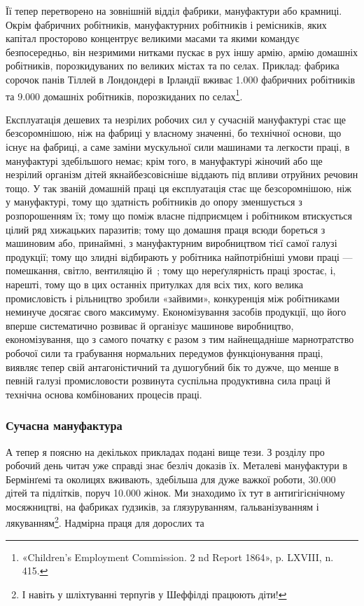 \parcont{}  %
Її тепер перетворено на зовнішній відділ фабрики, мануфактури
або крамниці. Окрім фабричних робітників, мануфактурних робітників
і ремісників, яких капітал просторово концентрує великими
масами та якими командує безпосередньо, він незримими
нитками пускає в рух іншу армію, армію домашніх робітників,
порозкидуваних по великих містах та по селах. Приклад: фабрика
сорочок панів Тіллей в Лондондері в Ірландії вживає \num{1.000} фабричних
робітників та \num{9.000} домашніх робітників, порозкиданих по
селах\footnote{
«Children’s Employment Commission. 2 nd Report 1864»,
p. LXVIII, n. 415.
}.

Експлуатація дешевих та незрілих робочих сил у сучасній
мануфактурі стає ще безсоромнішою, ніж на фабриці у власному
значенні, бо технічної основи, що існує на фабриці, а саме заміни
мускульної сили машинами та легкости праці, в мануфактурі
здебільшого немає; крім того, в мануфактурі жіночий або ще
незрілий організм дітей якнайбезсовісніше віддають під впливи
отруйних речовин тощо. У так званій домашній праці ця експлуатація
стає ще безсоромнішою, ніж у мануфактурі, тому що здатність
робітників до опору зменшується з розпорошенням їх;
тому що поміж власне підприємцем і робітником втискується цілий
ряд хижацьких паразитів; тому що домашня праця всюди бореться
з машиновим або, принаймні, з мануфактурним виробництвом тієї
самої галузі продукції; тому що злидні відбирають у робітника
найпотрібніші умови праці — помешкання, світло, вентиляцію
й~; тому що нереґулярність праці зростає, і, нарешті, тому
що в цих останніх притулках для всіх тих, кого велика промисловість
і рільництво зробили «зайвими», конкуренція між робітниками
неминуче досягає свого максимуму. Економізування
засобів продукції, що його вперше систематично розвиває й
організує машинове виробництво, економізування, що з самого
початку є разом з тим найнещадніше марнотратство робочої
сили та грабування нормальних передумов функціонування праці,
виявляє тепер свій антагоністичний та душогубний бік то дужче,
що менше в певній галузі промисловости розвинута суспільна
продуктивна сила праці й технічна основа комбінованих процесів
праці.

\manualpagebreak{}
\subsubsection{Сучасна мануфактура}

А тепер я поясню на декількох прикладах подані вище тези.
З розділу про робочий день читач уже справді знає безліч доказів
їх. Металеві мануфактури в Бермінґемі та околицях вживають,
здебільша для дуже важкої роботи, \num{30.000} дітей та підлітків,
поруч \num{10.000} жінок. Ми знаходимо їх тут в антигігієнічному
мосяжництві, на фабриках ґудзиків, за ґлязуруванням, ґальванізуванням
і лякуванням\footnote{
І навіть у шліхтуванні терпугів у Шеффілді працюють діти!
}. Надмірна праця для дорослих та
\parbreak{}  %
